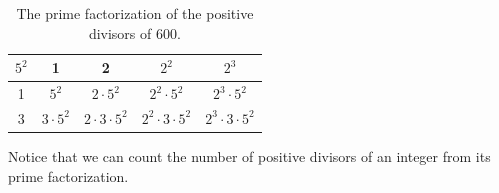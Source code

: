\begin{exam}
\begin{soln}
\begin{table}[hbtp]
                \vspace{.25in} %
                    \begin{tabular}{c|| c|c|c|c}
                        $5^2$ & 1 & 2 & $2^2$ & $2^3$  \\ \hline \hline
                        1 & $5^2$ & $2 \cdot 5^2$ & $2^2\cdot 5^2$ & $2^3\cdot 5^2$  \\ \hline
                        3 & $3\cdot 5^2$ & $2 \cdot 3\cdot 5^2$ & $2^2\cdot 3\cdot 5^2$ & $2^3\cdot 3\cdot 5^2$  \\ 
                    \end{tabular}        
                \caption{The prime factorization of the positive divisors of 600.}
                \label{table_divisors600_pfform}
                \end{table}
            \end{soln}
\end{exam}

Notice that we can count the number of positive divisors of an integer from its prime factorization.

